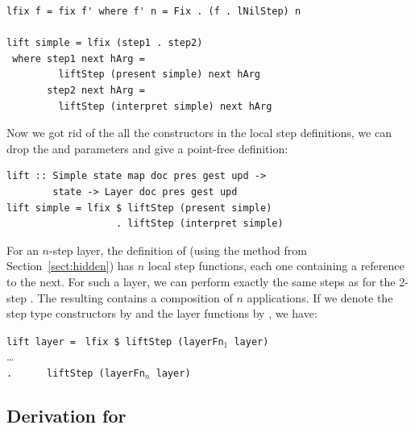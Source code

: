 \documentclass[preprint,natbib]{sigplanconf}
\begin{document}
\begin{small}%
\begin{verbatim}
lfix f = fix f' where f' n = Fix . (f . lNilStep) n

lift simple = lfix (step1 . step2)
 where step1 next hArg = 
         liftStep (present simple) next hArg
       step2 next hArg = 
         liftStep (interpret simple) next hArg
\end{verbatim}
\end{small}

Now we got rid of the all the constructors in the local step definitions, we can drop the  and  parameters and give a point-free definition:

\begin{small} %
\begin{verbatim}
lift :: Simple state map doc pres gest upd ->
        state -> Layer doc pres gest upd
lift simple = lfix $ liftStep (present simple) 
                   . liftStep (interpret simple)
\end{verbatim}%
\end{small}



For an $n$-step layer, the definition of  (using the method from Section~\ref{sect:hidden}) has $n$ local step functions, each one containing a reference to the next. \bc {} \ec For such a layer, we can perform exactly the same steps as for the 2-step . The resulting  contains a composition of $n$  applications. If we denote the step type constructors by  and the layer functions by , we have:

\begin{small}
\begin{tabbing}
{\tt lift layer = } \= {\tt lfix \$ liftStep (layerFn$_1$ layer)} \\
                    \>       \dots \\
                    \> {\tt .~~~~~~liftStep (layerFn$_n$ layer)}\\
\end{tabbing}%
\end{small}



%																
\subsection{Derivation for } \label{subsubsectcombine}
\end{document}
